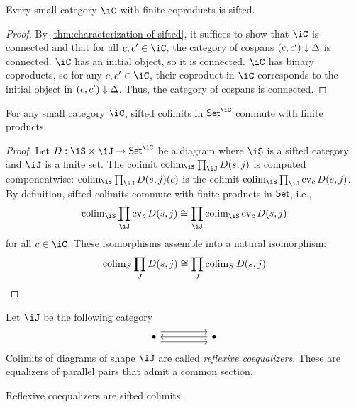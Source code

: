 \documentclass{zett}
\begin{document}
\begin{cor}\label{cor:finite-coproducts-then-sifted}
  Every small category $\iC$ with finite coproducts is sifted.
\end{cor}
\begin{proof}
  By \cref{thm:characterization-of-sifted}, it suffices to show that $\iC$ is connected and that for all $c, c' \in \iC$, the category of cospans $(c, c') \downarrow \Delta$ is connected.
  $\iC$ has an initial object, so it is connected.
  $\iC$ has binary coproducts, so for any $c, c' \in \iC$, their coproduct in $\iC$ corresponds to the initial object in $(c, c') \downarrow \Delta$.
  Thus, the category of cospans is connected.
\end{proof}

\begin{lem}\label{lem:functor-category-sifted-colimits-commute-with-finite-products}
  For any small category $\iC$, sifted colimits in $\CSet^{\iC}$ commute with finite products.
\end{lem}
\begin{proof}
  Let $D : \iS \times \iJ \to \CSet^{\iC}$ be a diagram where $\iS$ is a sifted category and $\iJ$ is a finite set.
  The colimit $\colim_{\iS}\prod_{\iJ}D(s,j)$ is computed componentwise: $\colim_{\iS}\prod_{\iJ}D(s,j)(c)$ is the colimit $\colim_{\iS}\prod_{\iJ}\ev_{c}D(s,j)$.
  By definition, sifted colimits commute with finite products in $\mathsf{Set}$, i.e.,
  \[
    \colim_{\iS}\prod_{\iJ}\ev_{c}D(s,j) \iso \prod_{\iJ}\colim_{\iS}\ev_{c}D(s,j)
  \]
  for all $c \in \iC$.
  These isomorphisms assemble into a natural isomorphism:
  \[
    \operatorname{colim}_{S}\prod_{J}D(s,j) \cong \prod_{J}\operatorname{colim}_{S}D(s,j)
  \]
\end{proof}

\begin{defn}
  Let $\iJ$ be the following category
  \[
    \begin{tikzcd}
      \bullet && \bullet
      \arrow[shift left=2, from=1-1, to=1-3]
      \arrow[shift right=2, from=1-1, to=1-3]
      \arrow[from=1-3, to=1-1]
    \end{tikzcd}
  \]
  Colimits of diagrams of shape $\iJ$ are called \emph{reflexive coequalizers}.
  These are equalizers of parallel pairs that admit a common section.
\end{defn}

\begin{rmk}
  Reflexive coequalizers are sifted colimits.
\end{rmk}
\end{document}
